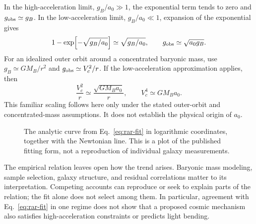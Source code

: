 \documentclass[12pt]{article}
\begin{document}
In the high-acceleration limit, $g_B/a_0\gg1$, the exponential term tends to zero and $g_{\rm obs}\simeq g_B$. In the low-acceleration limit, $g_B/a_0\ll1$, expansion of the exponential gives
\begin{equation}
  1-\exp\!\left[-\sqrt{g_B/a_0}\right]
  \simeq\sqrt{g_B/a_0},
  \qquad
  g_{\rm obs}\simeq\sqrt{a_0g_B}.
  \label{eq:rar-limits}
\end{equation}
For an idealized outer orbit around a concentrated baryonic mass, use $g_B\simeq GM_B/r^2$ and $g_{\rm obs}\simeq V_c^2/r$. If the low-acceleration approximation applies, then
\begin{equation}
  \frac{V_c^2}{r}\simeq\frac{\sqrt{GM_Ba_0}}{r},
  \qquad
  V_c^4\simeq GM_Ba_0.
  \label{eq:btfr-limit}
\end{equation}
This familiar scaling follows here only under the stated outer-orbit and concentrated-mass assumptions. It does not establish the physical origin of $a_0$.

\begin{figure}[ht]
  \centering
  \caption{The analytic curve from Eq.~\eqref{eq:rar-fit} in logarithmic coordinates, together with the Newtonian line. This is a plot of the published fitting form, not a reproduction of individual galaxy measurements.}
  \label{fig:rar-fit}
\end{figure}

The empirical relation leaves open how the trend arises. Baryonic mass modeling, sample selection, galaxy structure, and residual correlations matter to its interpretation. Competing accounts can reproduce or seek to explain parts of the relation; the fit alone does not select among them. In particular, agreement with Eq.~\eqref{eq:rar-fit} in one regime does not show that a proposed cosmic mechanism also satisfies high-acceleration constraints or predicts light bending.
\end{document}
